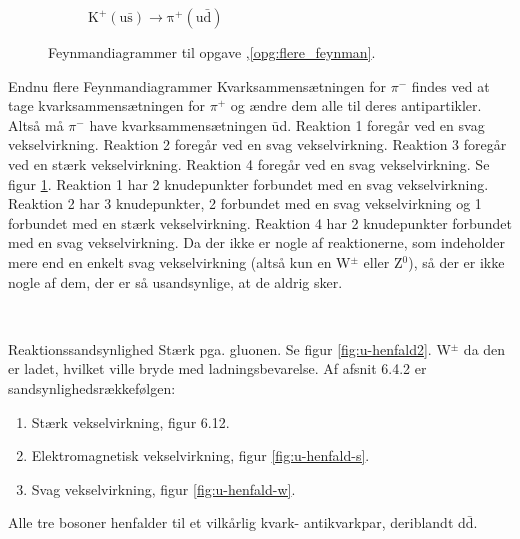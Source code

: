 \begin{figure}
\begin{subfigure}[t]{.47\textwidth}
        \caption{$\mathrm{K^+(u\bar{s})\rightarrow \pi^+(u\bar d)}$}
    \end{subfigure}
    \caption{Feynmandiagrammer til opgave \thechapter,\ref{opg:flere_feynman}.}
    \label{fig:flere_feynman}
\end{figure}
%
\begin{opgave}{Endnu flere Feynmandiagrammer} \label{opg:flere_feynman}
    \opg Kvarksammensætningen for $\pi^-$ findes ved at tage kvarksammensætningen for $\pi^+$ og ændre dem alle til deres antipartikler. Altså må $\pi^-$ have kvarksammensætningen $\bar{\text{u}}$d.
    \opg Reaktion 1 foregår ved en svag vekselvirkning. Reaktion 2 foregår ved en svag vekselvirkning. Reaktion 3 foregår ved en stærk vekselvirkning. Reaktion 4 foregår ved en svag vekselvirkning.
    \opg Se figur \ref{fig:flere_feynman}.
    \opg Reaktion 1 har 2 knudepunkter forbundet med en svag vekselvirkning. Reaktion 2 har 3 knudepunkter, 2 forbundet med en svag vekselvirkning og 1 forbundet med en stærk vekselvirkning. Reaktion 4 har 2 knudepunkter forbundet med en svag vekselvirkning.
    \opg Da der ikke er nogle af reaktionerne, som indeholder mere end en enkelt svag vekselvirkning (altså kun en W$^\pm$ eller Z$^0$), så der er ikke nogle af dem, der er så usandsynlige, at de aldrig sker.
\end{opgave}\\

\begin{opgave}{Reaktionssandsynlighed}
    \opg Stærk pga. gluonen.
    \opg Se figur \ref{fig:u-henfald2}.
    \opg W$^\pm$ da den er ladet, hvilket ville bryde med ladningsbevarelse.
    \opg Af afsnit 6.4.2 %
    er sandsynlighedsrækkefølgen:
    \begin{enumerate}
        \item Stærk vekselvirkning, figur 6.12.%
        \item Elektromagnetisk vekselvirkning, figur \ref{fig:u-henfald-s}.
        \item Svag vekselvirkning, figur \ref{fig:u-henfald-w}.
    \end{enumerate}
    \opg Alle tre bosoner henfalder til et vilkårlig kvark- antikvarkpar, deriblandt d$\bar{\mathrm{d}}$.
\end{opgave}

